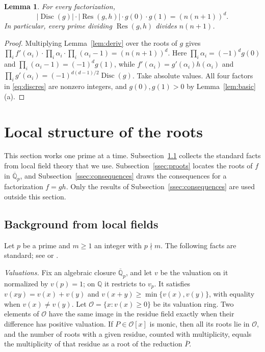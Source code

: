 \documentclass[11pt]{amsart}
\newtheorem{lemma}[theorem]{Lemma}
\theoremstyle{definition}
\theoremstyle{remark}
\numberwithin{equation}{section}
\newcommand{\Q}{\mathbb{Q}}
\newcommand{\Disc}{\operatorname{Disc}}
\newcommand{\Res}{\operatorname{Res}}
\newcommand{\cO}{\mathcal{O}}
\begin{document}
\begin{lemma}\label{lem:discres}
For every factorization,
\begin{equation}\label{eq:discres}
 |\Disc(g)|\cdot|\Res(g,h)|\cdot g(0)\cdot g(1)=(n(n+1))^d .
\end{equation}
In particular, every prime dividing $\Res(g,h)$ divides $n(n+1)$.
\end{lemma}

\begin{proof}
Multiplying Lemma~\ref{lem:deriv} over the roots of $g$ gives
$\prod_if'(\alpha_i)\cdot\prod_i\alpha_i\cdot\prod_i(\alpha_i-1)=(n(n+1))^d$.
Here $\prod_i\alpha_i=(-1)^dg(0)$ and $\prod_i(\alpha_i-1)=(-1)^dg(1)$, while
$f'(\alpha_i)=g'(\alpha_i)h(\alpha_i)$ and
$\prod_ig'(\alpha_i)=(-1)^{d(d-1)/2}\Disc(g)$. Take absolute values.
All four factors in \eqref{eq:discres} are nonzero integers, and $g(0),g(1)>0$ by Lemma~\ref{lem:basic}(a).
\end{proof}

\section{Local structure of the roots}\label{sec:local}

This section works one prime at a time. Subsection~\ref{ssec:localfields}
collects the standard facts from local field theory that we use.
Subsection~\ref{ssec:proots} locates the roots of $f$ in
$\overline{\Q}_p$, and Subsection~\ref{ssec:consequences} draws the
consequences for a factorization $f=gh$. Only the results of
Subsection~\ref{ssec:consequences} are used outside this section.

\subsection{Background from local fields}\label{ssec:localfields}
Let $p$ be a prime and $m\ge1$ an integer with $p\nmid m$. The following
facts are standard; see \cite[Ch.~II]{Neukirch} or \cite[Ch.~7]{Milne}.

\emph{Valuations.} Fix an algebraic closure $\overline{\Q}_p$, and let $v$
be the valuation on it normalized by $v(p)=1$; on $\Q$ it restricts to $v_p$.
It satisfies $v(xy)=v(x)+v(y)$ and $v(x+y)\ge\min\{v(x),v(y)\}$, with
equality when $v(x)\ne v(y)$. Let $\cO=\{x:v(x)\ge0\}$ be its valuation
ring. Two elements of $\cO$ have the same image in the residue field exactly
when their difference has positive valuation. If $P\in\cO[x]$ is monic, then
all its roots lie in $\cO$, and the number of roots with a given residue,
counted with multiplicity, equals the multiplicity of that residue as a root
of the reduction $\overline P$.
\end{document}
